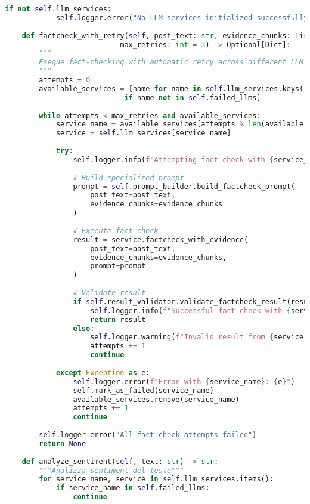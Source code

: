 \documentclass[12pt,a4paper]{report}
\begin{document}
\begin{lstlisting}[language=Python, caption=LLM Manager Implementation]
        if not self.llm_services:
            self.logger.error("No LLM services initialized successfully!")
    
    def factcheck_with_retry(self, post_text: str, evidence_chunks: List[dict], 
                           max_retries: int = 3) -> Optional[Dict]:
        """
        Esegue fact-checking with automatic retry across different LLM providers
        """
        attempts = 0
        available_services = [name for name in self.llm_services.keys() 
                            if name not in self.failed_llms]
        
        while attempts < max_retries and available_services:
            service_name = available_services[attempts % len(available_services)]
            service = self.llm_services[service_name]
            
            try:
                self.logger.info(f"Attempting fact-check with {service_name} (attempt {attempts + 1})")
                
                # Build specialized prompt
                prompt = self.prompt_builder.build_factcheck_prompt(
                    post_text=post_text,
                    evidence_chunks=evidence_chunks
                )
                
                # Execute fact-check
                result = service.factcheck_with_evidence(
                    post_text=post_text,
                    evidence_chunks=evidence_chunks,
                    prompt=prompt
                )
                
                # Validate result
                if self.result_validator.validate_factcheck_result(result):
                    self.logger.info(f"Successful fact-check with {service_name}")
                    return result
                else:
                    self.logger.warning(f"Invalid result from {service_name}")
                    attempts += 1
                    continue
                    
            except Exception as e:
                self.logger.error(f"Error with {service_name}: {e}")
                self.mark_as_failed(service_name)
                available_services.remove(service_name)
                attempts += 1
                continue
        
        self.logger.error("All fact-check attempts failed")
        return None
    
    def analyze_sentiment(self, text: str) -> str:
        """Analizza sentiment del testo"""
        for service_name, service in self.llm_services.items():
            if service_name in self.failed_llms:
                continue
                

\end{lstlisting}
\end{document}
